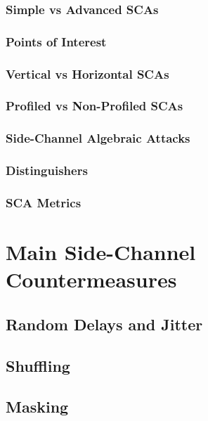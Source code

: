 \subsubsection{Simple vs Advanced SCAs}
\subsubsection{Points of Interest}

\subsubsection{Vertical vs Horizontal SCAs}
\subsubsection{Profiled vs Non-Profiled SCAs}
\subsubsection{Side-Channel Algebraic Attacks}
\subsubsection{Distinguishers}
\subsubsection{SCA Metrics}



\section{Main Side-Channel Countermeasures}
\subsection{Random Delays and Jitter}
\subsection{Shuffling}
\subsection{Masking}\label{sec:masking}



